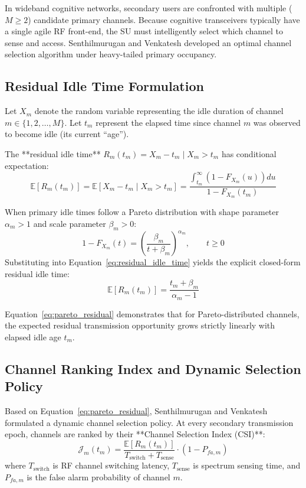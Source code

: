 In wideband cognitive networks, secondary users are confronted with multiple ($M \ge 2$) candidate primary channels. Because cognitive transceivers typically have a single agile RF front-end, the SU must intelligently select which channel to sense and access. Senthilmurugan and Venkatesh \cite{senthilmurugan2017channel} developed an optimal channel selection algorithm under heavy-tailed primary occupancy.

\subsection{Residual Idle Time Formulation}
Let $X_m$ denote the random variable representing the idle duration of channel $m \in \{1, 2, \dots, M\}$. Let $t_m$ represent the elapsed time since channel $m$ was observed to become idle (its current ``age'').

The **residual idle time** $R_m(t_m) = X_m - t_m \mid X_m > t_m$ has conditional expectation:
\begin{equation}
    \label{eq:residual_idle_time}
    \mathbb{E}[R_m(t_m)] = \mathbb{E}[X_m - t_m \mid X_m > t_m] = \frac{\int_{t_m}^\infty (1 - F_{X_m}(u)) du}{1 - F_{X_m}(t_m)}
\end{equation}

When primary idle times follow a Pareto distribution with shape parameter $\alpha_m > 1$ and scale parameter $\beta_m > 0$:
\begin{equation}
    1 - F_{X_m}(t) = \left( \frac{\beta_m}{t + \beta_m} \right)^{\alpha_m}, \qquad t \ge 0
\end{equation}
Substituting into Equation~\eqref{eq:residual_idle_time} yields the explicit closed-form residual idle time:
\begin{equation}
    \label{eq:pareto_residual}
    \mathbb{E}[R_m(t_m)] = \frac{t_m + \beta_m}{\alpha_m - 1}
\end{equation}

Equation~\eqref{eq:pareto_residual} demonstrates that for Pareto-distributed channels, the expected residual transmission opportunity grows strictly linearly with elapsed idle age $t_m$.

\subsection{Channel Ranking Index and Dynamic Selection Policy}
Based on Equation~\eqref{eq:pareto_residual}, Senthilmurugan and Venkatesh \cite{senthilmurugan2017channel} formulated a dynamic channel selection policy. At every secondary transmission epoch, channels are ranked by their **Channel Selection Index (CSI)**:
\begin{equation}
    \label{eq:channel_selection_index}
    \mathcal{J}_m(t_m) = \frac{\mathbb{E}[R_m(t_m)]}{T_{\mathrm{switch}} + T_{\mathrm{sense}}} \cdot \left( 1 - P_{fa, m} \right)
\end{equation}
where $T_{\mathrm{switch}}$ is RF channel switching latency, $T_{\mathrm{sense}}$ is spectrum sensing time, and $P_{fa, m}$ is the false alarm probability of channel $m$.

